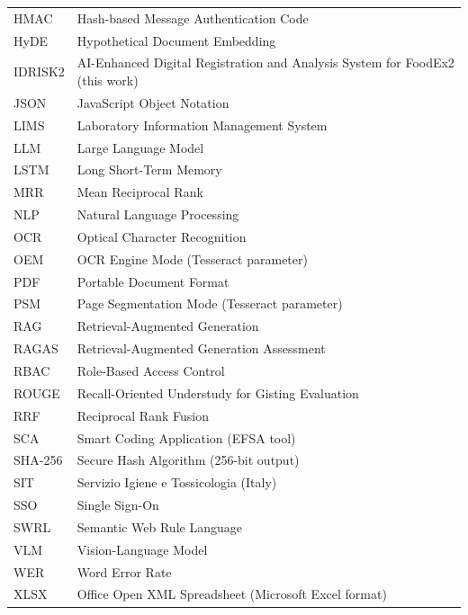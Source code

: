 \begin{longtable}{@{}p{}p{}@{}}
HMAC & Hash-based Message Authentication Code\\
HyDE & Hypothetical Document Embedding\\
IDRISK2 & AI-Enhanced Digital Registration and Analysis System for FoodEx2 (this work)\\
JSON & JavaScript Object Notation\\
LIMS & Laboratory Information Management System\\
LLM & Large Language Model\\
LSTM & Long Short-Term Memory\\
MRR & Mean Reciprocal Rank\\
NLP & Natural Language Processing\\
OCR & Optical Character Recognition\\
OEM & OCR Engine Mode (Tesseract parameter)\\
PDF & Portable Document Format\\
PSM & Page Segmentation Mode (Tesseract parameter)\\
RAG & Retrieval-Augmented Generation\\
RAGAS & Retrieval-Augmented Generation Assessment\\
RBAC & Role-Based Access Control\\
ROUGE & Recall-Oriented Understudy for Gisting Evaluation\\
RRF & Reciprocal Rank Fusion\\
SCA & Smart Coding Application (EFSA tool)\\
SHA-256 & Secure Hash Algorithm (256-bit output)\\
SIT & Servizio Igiene e Tossicologia (Italy)\\
SSO & Single Sign-On\\
SWRL & Semantic Web Rule Language\\
VLM & Vision-Language Model\\
WER & Word Error Rate\\
XLSX & Office Open XML Spreadsheet (Microsoft Excel format)\\
\bottomrule
\end{longtable}

